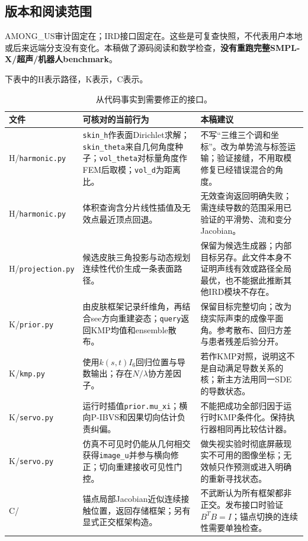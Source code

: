 \documentclass[UTF8,11pt,a4paper,fontset=fandol]{ctexart}
\numberwithin{equation}{section}
\theoremstyle{plain}
\theoremstyle{definition}
\theoremstyle{remark}
\begin{document}
\subsection{版本和阅读范围}
AMONG\_US审计固定在；IRD接口固定在\cite{AmongCode,RealUSCode}。这些是可复查快照，不代表用户本地或后来远端分支没有变化。本稿做了源码阅读和数学检查，\textbf{没有重跑完整SMPL-X/超声/机器人benchmark}。

下表中的H表示路径，K表示，C表示。
\begin{table}[H]
\centering\small
\caption{从代码事实到需要修正的接口。}
\begin{tabularx}{\textwidth}{P{30mm}YY}
\toprule 文件 & 可核对的当前行为 & 本稿建议\\\midrule
H/\texttt{harmonic.py} & \texttt{skin\_h}作表面Dirichlet求解；\texttt{skin\_theta}来自几何角度种子；\texttt{vol\_theta}对标量角度作FEM后取模；\texttt{vol\_d}为距离比。 & 不写“三维三个调和坐标”。改为单势流与标签运输；验证接缝，不用取模修复已经错误混合的角度。\\
H/\texttt{harmonic.py} & 体积查询含分片线性插值及无效点最近顶点回退。 & 无效查询返回明确失败；需连续导数的范围采用已验证的平滑势、流和变分Jacobian。\\
H/\texttt{projection.py} & 候选皮肤三角投影与动态规划连续性代价生成一条表面路径。 & 保留为候选生成器；内部目标另存。此文件本身不证明声线有效或路径全局最优，也不能据此推断其他IRD模块不存在。\\
K/\texttt{prior.py} & 由皮肤框架记录纤维角，再结合see方向重建姿态；\texttt{query}返回KMP均值和ensemble散布。 & 保留目标完整切向；改为绕实际声束的成像平面角。参考散布、回归方差与患者残差后验分开。\\
K/\texttt{kmp.py} & 使用$k(s,t)I_6$回归位置与导数输出；存在$N/\lambda$协方差因子。 & 若作KMP对照，说明这不是自动满足导数关系的核；新主方法用同一SDE的导数状态。\\
K/\texttt{servo.py} & 运行时插值\texttt{prior.mu\_xi}；横向P-IBVS和因果切向估计负责纠偏。 & 不能把成功全部归因于运行时KMP条件化。保持执行器相同再比较估计器。\\
K/\texttt{servo.py} & 仿真不可见时仍能从几何相交获得\texttt{image\_u}并参与横向修正；切向重建接收可见性门控。 & 做失视实验时彻底屏蔽现实不可用的图像坐标；无效帧只作预测或进入明确的重新寻找状态。\\
C/ & 锚点局部Jacobian近似连续接触位置，返回存储框架；另有显式正交框架构造。 & 不武断认为所有框架都非正交。发布接口时验证$B^TB=I$；锚点切换的连续性需要单独检查。\\
\bottomrule
\end{tabularx}
\end{table}
\end{document}
